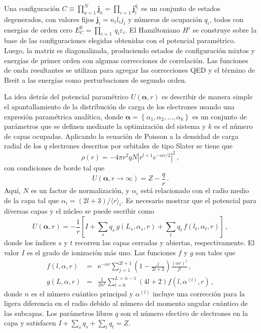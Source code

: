 Una configuración 
$C\equiv\prod_{a=1}^N\mathbf{j}_a=\prod_{i=1}\mathbf{j}_i^{q_i}$ es un 
conjunto de estados degenerados, con valores fijos 
$\mathbf{j}_i=n_il_ij_i$
y números de ocupación $q_i$, todos con energías de orden cero 
$E_C^0=\prod_{i=1}\,q_i\varepsilon_i$. 
El Hamiltoniano $H'$ se construye sobre la base de las configuraciones 
elegidas obtenidas con el potencial paramétrico. Luego, la matriz es 
diagonalizada, produciendo estados de configuración mixtos y energías 
de primer orden con algunas correcciones de correlación. Las funciones 
de onda resultantes se utilizan para agregar las correcciones QED y el 
término de Breit a las energías como perturbaciones de segundo orden.

La idea detrás del potencial paramétrico $U(\boldsymbol{\alpha},r)$
\cite{Klapisch:77} es describir de manera simple el apantallamiento de 
la distribución de carga de los electrones usando una expresión 
paramétrica analítica, donde 
$\boldsymbol{\alpha}=\left\{\alpha_1,\alpha_2,\ldots,\alpha_k\right\}$ 
es un conjunto de parámetros que se definen mediante la optimización 
del sistema y $k$ es el número de capas ocupadas. Aplicando la ecuación 
de Poisson a la densidad de carga radial de los $q$ electrones descritos 
por orbitales de tipo Slater se tiene que
\begin{equation}
\rho(r) = -4\pi r^2 qN\left|r^{l+1}e^{-\alpha r/2}\right|^2\,,
\end{equation} 
con condiciones de borde tal que
\begin{equation}
U(\boldsymbol{\alpha},r\rightarrow\infty)=Z-\frac{q}{r}\,.
\end{equation} 
Aquí, $N$ es un factor de normalización, y $\alpha_i$ está relacionado 
con el radio medio de la capa tal que $\alpha_i=(2l+3)/\langle r\rangle_i$. 
Es necesario mostrar que el potencial para diversas capas y el núcleo 
se puede escribir como
\begin{equation}
U(\boldsymbol{\alpha},r)=-\frac{1}{r} \left[I+\sum_s q_s\, g(L_s,\alpha_s,r) 
+ \sum_t q_t\,f(l_t,\alpha_t,r)\right]\,,
\label{eq:potparam}
\end{equation}
donde los índices $s$ y $t$ recorren las capas cerradas y abiertas, 
respectivamente. El valor $I$ es el grado de ionización más uno. 
Las funciones $f$ y $g$ son tales que
\begin{eqnarray}
f(l,\alpha,r)&=&\mathrm{e}^{-\alpha r}\sum_{j=1}^{2l+1}
\left(1-\frac{j}{2l+2}\right)\frac{(\alpha r)^j}{j!}\,,\\
g(L,\alpha,r)&=&\frac{1}{2n^2}\sum_{l=0}^{L=n-1}
(4l+2)f\left(l,\alpha^{(l)},r\right)\,,
\end{eqnarray}
donde $n$ es el número cuántico principal y $\alpha^{(l)}$ incluye una
corrección para la ligera diferencia en el radio debido al número del
momento angular cuántico de las subcapas. 
Los parámetros libres $q$ son el número efectivo de electrones en la 
capa y satisfacen $I+\sum_s q_s+\sum_t q_t=Z$. 

